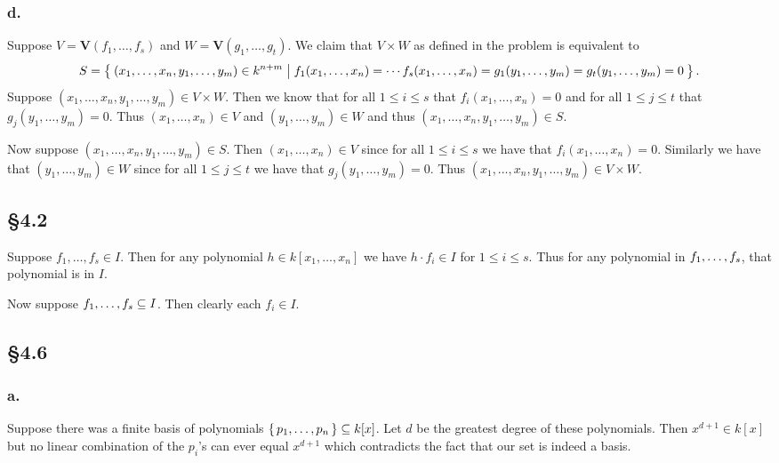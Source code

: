 \documentclass[letterpaper]{article}
\begin{document}
\subsubsection{d.}

Suppose $V = \textbf{V}(f_{1}, \ldots, f_{s})$ and $W = \textbf{V}(g_{1}, \ldots, g_{t})$. We claim that $V \times W$ as defined in the problem is equivalent to
\[
  S = \Set{(x_{1}, \ldots, x_{n}, y_{1}, \ldots, y_{m}) \in k^{n + m} | f_{1}(x_{1}, \ldots, x_{n}) = \cdots f_{s}(x_{1}, \ldots, x_{n}) = g_{1}(y_{1}, \ldots, y_{m}) = g_{t}(y_{1}, \ldots, y_{m}) = 0}.
\]
Suppose $(x_{1}, \ldots, x_{n}, y_{1}, \ldots, y_{m}) \in V \times W$. Then we know that for all $1 \leq i \leq s$ that $f_{i}(x_{1}, \ldots, x_{n}) = 0$ and for all $1 \leq j \leq t$ that $g_{j}(y_{1}, \ldots, y_{m}) = 0$. Thus $(x_{1}, \ldots, x_{n}) \in V$ and $(y_{1}, \ldots, y_{m}) \in W$ and thus $(x_{1}, \ldots, x_{n}, y_{1}, \ldots, y_{m}) \in S$.


Now suppose $(x_{1}, \ldots, x_{n}, y_{1}, \ldots, y_{m}) \in S$. Then $(x_{1}, \ldots, x_{n}) \in V$ since for all $1 \leq i \leq s$ we have that $f_{i}(x_{1}, \ldots, x_{n}) = 0$. Similarly we have that $(y_{1}, \ldots, y_{m}) \in W$ since for all $1 \leq j \leq t$ we have that $g_{j}(y_{1}, \ldots, y_{m}) = 0$. Thus  $(x_{1}, \ldots, x_{n}, y_{1}, \ldots, y_{m}) \in V \times W$.

\clearpage

\subsection{\S 4.2}

Suppose $f_{1}, \ldots, f_{s} \in I$. Then for any polynomial $h \in k[x_{1}, \ldots, x_{n}]$ we have $h \cdot f_{i} \in I$ for $1 \leq i \leq s$. Thus for any polynomial in $\gen{ f_{1}, \ldots, f_{s} }$, that polynomial is in $I$.

Now suppose $\gen{ f_{1}, \ldots, f_{s} } \subseteq I$. Then clearly each $f_{i} \in I$.

\subsection{\S 4.6}

\subsubsection{a.}

Suppose there was a finite basis of polynomials $\set{p_{1}, \ldots, p_{n}} \subseteq k[x]$. Let $d$ be the greatest degree of these polynomials. Then $x^{d + 1} \in k[x]$ but no linear combination of the $p_{i}$'s can ever equal $x^{d + 1}$ which contradicts the fact that our set is indeed a basis.
\end{document}

